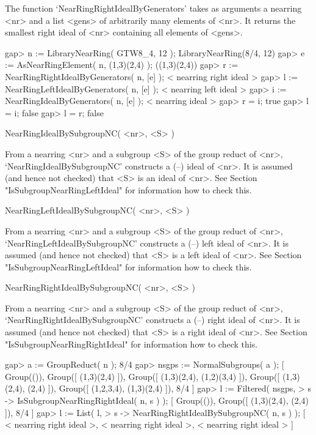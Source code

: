 The function `NearRingRightIdealByGenerators' takes as arguments a nearring
<nr> and a list <gens> of arbitrarily many elements of <nr>. It returns the
smallest right ideal of <nr> containing all elements of <gens>.

\beginexample
    gap> n := LibraryNearRing( GTW8_4, 12 );
    LibraryNearRing(8/4, 12)
    gap> e := AsNearRingElement( n, (1,3)(2,4) );         
    ((1,3)(2,4))
    gap> r := NearRingRightIdealByGenerators( n, [e] );
    < nearring right ideal >
    gap> l := NearRingLeftIdealByGenerators( n, [e] );
    < nearring left ideal >
    gap> i := NearRingIdealByGenerators( n, [e] );
    < nearring ideal >
    gap> r = i;
    true
    gap> l = i;
    false
    gap> l = r;
    false
\endexample

\>NearRingIdealBySubgroupNC( <nr>, <S> )

From a nearring <nr> and a subgroup <S> of the group reduct of <nr>,
`NearRingIdealBySubgroupNC' constructs a ({\GAP}--) ideal of <nr>. It is
assumed (and hence not checked) that <S> is an ideal of <nr>. See Section
"IsSubgroupNearRingLeftIdeal" for information how to check this.

\>NearRingLeftIdealBySubgroupNC( <nr>, <S> )

From a nearring <nr> and a subgroup <S> of the group reduct of <nr>,
`NearRingLeftIdealBySubgroupNC' constructs a ({\GAP}--) left ideal of <nr>. It
is assumed (and hence not checked) that <S> is a left ideal of <nr>. See
Section "IsSubgroupNearRingLeftIdeal" for information how to check this.

\>NearRingRightIdealBySubgroupNC( <nr>, <S> )

From a nearring <nr> and a subgroup <S> of the group reduct of <nr>,
`NearRingRightIdealBySubgroupNC' constructs a ({\GAP}--) right ideal of <nr>.
It is assumed (and hence not checked) that <S> is a right ideal of <nr>.
See Section "IsSubgroupNearRingRightIdeal" for information how to check this.

\beginexample
    gap> a := GroupReduct( n );                                          
    8/4
    gap> nsgps := NormalSubgroups( a );
    [ Group(()), Group([ (1,3)(2,4) ]), 
      Group([ (1,3)(2,4), (1,2)(3,4) ]), Group([ (1,3)(2,4), (2,4) ]), 
      Group([ (1,2,3,4), (1,3)(2,4) ]), 8/4 ]
    gap> l := Filtered( nsgps,                                             
    > s -> IsSubgroupNearRingRightIdeal( n, s ) );                      
    [ Group(()), Group([ (1,3)(2,4), (2,4) ]), 8/4 ]
    gap> l := List( l,      
    > s -> NearRingRightIdealBySubgroupNC( n, s ) );
    [ < nearring right ideal >, < nearring right ideal >, 
      < nearring right ideal > ]
\endexample

